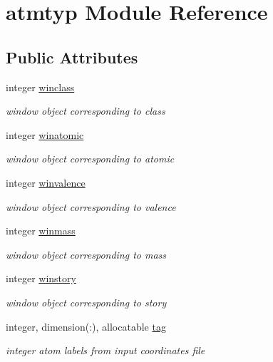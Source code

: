 \hypertarget{classatmtyp}{\section{atmtyp Module Reference}
\label{classatmtyp}
}
\subsection*{Public Attributes}
\begin{DoxyCompactItemize}
\item 
integer \hyperlink{classatmtyp_a7ae85452dea141868af664ea293b73d7}{winclass}
\begin{DoxyCompactList}\small\item\em window object corresponding to class \end{DoxyCompactList}\item 
integer \hyperlink{classatmtyp_a7fcd28189bb1b16fced8d4265d22296e}{winatomic}
\begin{DoxyCompactList}\small\item\em window object corresponding to atomic \end{DoxyCompactList}\item 
integer \hyperlink{classatmtyp_afea969ea2b20527ccc4ac738111d7e76}{winvalence}
\begin{DoxyCompactList}\small\item\em window object corresponding to valence \end{DoxyCompactList}\item 
integer \hyperlink{classatmtyp_ad0875491364a5b57ce9f73a7b821aa47}{winmass}
\begin{DoxyCompactList}\small\item\em window object corresponding to mass \end{DoxyCompactList}\item 
integer \hyperlink{classatmtyp_a7083dc9b2ebd8a47554e57ebfe81c573}{winstory}
\begin{DoxyCompactList}\small\item\em window object corresponding to story \end{DoxyCompactList}\item 
integer, dimension(\-:), allocatable \hyperlink{classatmtyp_adbff91a8e5a0a2bc4b5d9980f544afdc}{tag}
\begin{DoxyCompactList}\small\item\em integer atom labels from input coordinates file \end{DoxyCompactList}\item 

\end{DoxyCompactItemize}
